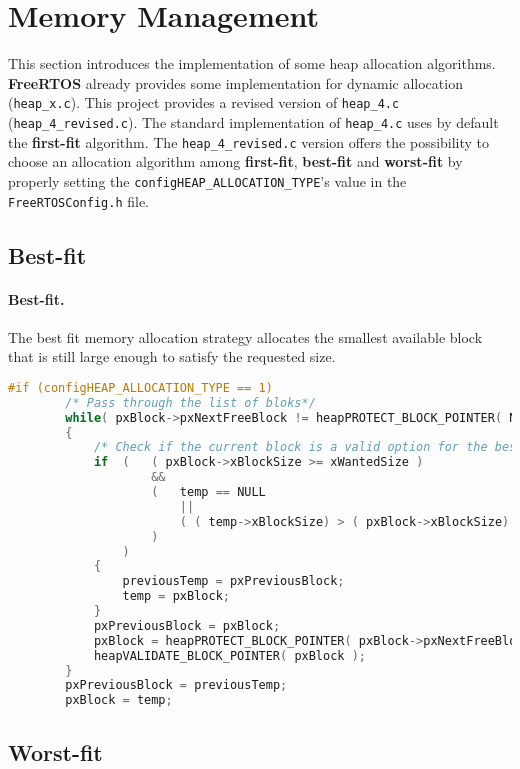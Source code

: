 \section{Memory Management}
\label{sec: Memory Management}
This section introduces the implementation of some heap allocation algorithms. \textbf{FreeRTOS} already provides some implementation for dynamic allocation (\texttt{heap\_x.c}).
This project provides a revised version of \texttt{heap\_4.c} (\texttt{heap\_4\_revised.c}). The standard implementation of \texttt{heap\_4.c} uses by default the \textbf{first-fit} algorithm. The \texttt{heap\_4\_revised.c} version offers the possibility to choose an allocation algorithm among \textbf{first-fit}, \textbf{best-fit} and \textbf{worst-fit} by properly setting the \texttt{configHEAP\_ALLOCATION\_TYPE}'s value in the \texttt{FreeRTOSConfig.h} file.

\subsection{Best-fit}
\label{subsec: Best-Fit}
\paragraph{Best-fit.} The best fit memory allocation strategy allocates the smallest available block that is still large enough to satisfy the requested size.
\begin{lstlisting}[language=C,caption={Custom implementation of Best-Fit algorithm added to heap\_4.c}]
#if (configHEAP_ALLOCATION_TYPE == 1)
        /* Pass through the list of bloks*/
        while( pxBlock->pxNextFreeBlock != heapPROTECT_BLOCK_POINTER( NULL ) )
        {
            /* Check if the current block is a valid option for the best fit algorithm  */
            if  (   ( pxBlock->xBlockSize >= xWantedSize )
                    &&
                    (   temp == NULL
                        ||
                        ( ( temp->xBlockSize) > ( pxBlock->xBlockSize) )
                    )
                )
            {
                previousTemp = pxPreviousBlock;
                temp = pxBlock;
            }
            pxPreviousBlock = pxBlock;
            pxBlock = heapPROTECT_BLOCK_POINTER( pxBlock->pxNextFreeBlock );
            heapVALIDATE_BLOCK_POINTER( pxBlock );
        }
        pxPreviousBlock = previousTemp;
        pxBlock = temp;
\end{lstlisting}

\subsection{Worst-fit}
